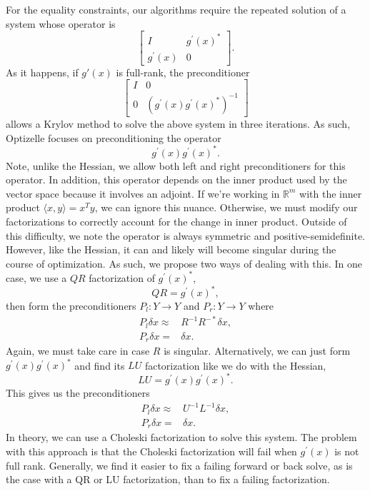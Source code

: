 \documentclass{report}
\newcommand{\re}{\mathbb{R}}
\begin{document}
        For the equality constraints, our algorithms require the repeated solution of a system whose operator is
$$\begin{bmatrix}
        I & g^\prime(x)^*\\
        g^\prime(x) & 0
\end{bmatrix}.$$
As it happens, if $g\prime(x)$ is full-rank, the preconditioner
$$\begin{bmatrix}
        I & 0\\ 
        0 & (g^\prime(x)g^\prime(x)^*)^{-1} 
\end{bmatrix}$$
allows a Krylov method to solve the above system in three iterations.  As such, Optizelle focuses on preconditioning the operator 
$$
        g^\prime(x)g^\prime(x)^*.
$$
Note, unlike the Hessian, we allow both left and right preconditioners for this operator.  In addition, this operator depends on the inner product used by the vector space because it involves an adjoint.  If we're working in $\re^m$ with the inner product $\langle x,y\rangle = x^Ty$, we can ignore this nuance.  Otherwise, we must modify our factorizations to correctly account for the change in inner product.  Outside of this difficulty, we note the operator is always symmetric and positive-semidefinite.  However, like the Hessian, it can and likely will become singular during the course of optimization.  As such, we propose two ways of dealing with this.  In one case, we use a $QR$ factorization of $g^\prime(x)^*$,
$$
        Q R = g^\prime(x)^*,
$$
then form the preconditioners $P_l: Y\rightarrow Y$ and $P_r: Y\rightarrow Y$ where
\begin{align*}
    P_l \delta x \approx& R^{-1}R^{-*}\delta x,\\
    P_r \delta x =& \delta x .
\end{align*}
Again, we must take care in case $R$ is singular.  Alternatively, we can just form $g^\prime(x)g^\prime(x)^*$ and find its $LU$ factorization like we do with the Hessian,
$$
        LU = g^\prime(x)g^\prime(x)^*.
$$
This gives us the preconditioners
\begin{align*}
        P_l\delta x \approx & U^{-1}L^{-1} \delta x,\\
        P_r\delta x = & \delta x.
\end{align*}
In theory, we can use a Choleski factorization to solve this system.  The problem with this approach is that the Choleski factorization will fail when $g^\prime(x)$ is not full rank.  Generally, we find it easier to fix a failing forward or back solve, as is the case with a QR or LU factorization, than to fix a failing factorization.
\end{document}
